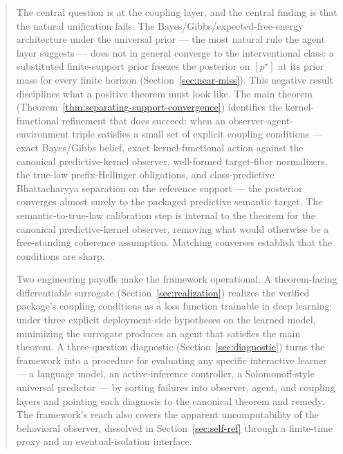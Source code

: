 \documentclass[11pt]{article}
\theoremstyle{definition}
\theoremstyle{remark}
\theoremstyle{plain}
\theoremstyle{definition}
\begin{document}
\begin{abstract}
\medskip
\noindent
The central question is at the coupling layer, and the central finding is that the natural unification fails. The Bayes/Gibbs/expected-free-energy architecture under the universal prior --- the most natural rule the agent layer suggests --- does not in general converge to the interventional class: a substituted finite-support prior freezes the posterior on $[p^\star]$ at its prior mass for every finite horizon (Section~\ref{sec:near-miss}). This negative result disciplines what a positive theorem must look like. The main theorem (Theorem~\ref{thm:separating-support-convergence}) identifies the kernel-functional refinement that does succeed: when an observer-agent-environment triple satisfies a small set of explicit coupling conditions --- exact Bayes/Gibbs belief, exact kernel-functional action against the canonical predictive-kernel observer, well-formed target-fiber normalizers, the true-law prefix-Hellinger obligations, and class-predictive Bhattacharyya separation on the reference support --- the posterior converges almost surely to the packaged predictive semantic target. The semantic-to-true-law calibration step is internal to the theorem for the canonical predictive-kernel observer, removing what would otherwise be a free-standing coherence assumption. Matching converses establish that the conditions are sharp.

\medskip
\noindent
Two engineering payoffs make the framework operational. A theorem-facing differentiable surrogate (Section~\ref{sec:realization}) realizes the verified package's coupling conditions as a loss function trainable in deep learning: under three explicit deployment-side hypotheses on the learned model, minimizing the surrogate produces an agent that satisfies the main theorem. A three-question diagnostic (Section~\ref{sec:diagnostic}) turns the framework into a procedure for evaluating any specific interactive learner --- a language model, an active-inference controller, a Solomonoff-style universal predictor --- by sorting failures into observer, agent, and coupling layers and pointing each diagnosis to the canonical theorem and remedy. The framework's reach also covers the apparent uncomputability of the behavioral observer, dissolved in Section~\ref{sec:self-ref} through a finite-time proxy and an eventual-isolation interface.


\end{abstract}
\end{document}
